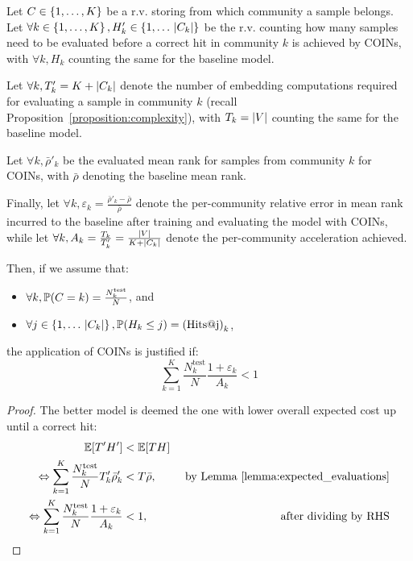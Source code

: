 \begin{proposition}
    \label{proposition:condition_applicability}
    Let $C \in \mathopen{}\left\{1,\dots,K\right\}$ be a r.v. storing from which community a sample belongs. Let $\forall k \in \mathopen{}\left\{1,\dots,K\right\}, H'_k \in \mathopen{}\left\{1,\dots\,\mathopen{}\left|C_k\right|\right\}$ be the r.v. counting how many samples need to be evaluated before a correct hit in community $k$ is achieved by COINs, with $\forall k, H_k$ counting the same for the baseline model. 
    
    Let $\forall k, T'_k=K+\mathopen{}\left|C_k\right|$ denote the number of embedding computations required for evaluating a sample in community $k$ (recall Proposition~\ref{proposition:complexity}), with $T_k=\mathopen{}\left|V\right|$ counting the same for the baseline model. 
    
    Let $\forall k, \bar{\rho}'_k$ be the evaluated mean rank for samples from community $k$ for COINs, with $\bar{\rho}$ denoting the baseline mean rank. 
    
    Finally, let $\forall k, \varepsilon_k = \frac{\bar{\rho}'_k - \bar{\rho}}{\bar{\rho}}$ denote the per-community relative error in mean rank incurred to the baseline after training and evaluating the model with COINs, while let $\forall k, A_k=\frac{T_k}{T'_k}=\frac{\mathopen{}\left|V\right|}{K+\mathopen{}\left|C_k\right|}$ denote the per-community acceleration achieved. 
    
    Then, if we assume that:
    \begin{itemize}
        \item $\forall k, \mathbb{P}\mathopen{}\left(C=k\right)=\frac{N_k^{\text{test}}}{N}$, and
        \item $\forall j \in \mathopen{}\left\{1,\dots\,\mathopen{}\left|C_k\right|\right\}, \mathbb{P}\mathopen{}\left(H_k \leq j\right)=\mathopen{}\left(\text{Hits@j}\right)_k$,
    \end{itemize}
     the application of COINs is justified if:
    \begin{equation}
        \label{eq:condition_applicability}
        \sum_{k=1}^{K}{\frac{N_k^{\text{test}}}{N} \frac{1 + \varepsilon_k}{A_k}} < 1
    \end{equation}
\end{proposition}
\begin{proof}
The better model is deemed the one with lower overall expected cost up until a correct hit:
    \begin{align*}
        \mathbb{E}\mathopen{}\left[T' H'\right] &< \mathbb{E}\mathopen{}\left[T H\right] \\
        \Leftrightarrow \sum_{k=1}^{K}{\frac{N_k^{\text{test}}}{N} T'_k \bar{\rho}'_k} &< T \bar{\rho}, & \text{ by Lemma~\ref{lemma:expected_evaluations}} \\
        \Leftrightarrow \sum_{k=1}^{K}{\frac{N_k^{\text{test}}}{N} \frac{1 + \varepsilon_k}{A_k}} &< 1, & \text{ after dividing by RHS}
    \end{align*}
\end{proof}%

